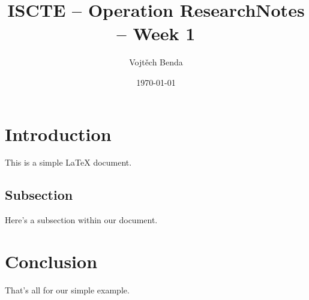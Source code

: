 \documentclass{article}
\begin{document}
 

\title{ISCTE – Operation Research} 
\author{Vojtěch Benda}
\maketitle 
\title{Notes – Week 1}
\date{\today}

\maketitle 

\section{Introduction}  %
This is a simple LaTeX document.  %

\subsection{Subsection}  %
Here's a subsection within our document.  %

\section{Conclusion}  %
That's all for our simple example.  %
\end{document}
